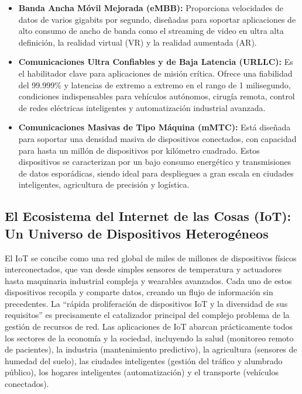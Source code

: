 \documentclass[12pt,a4paper]{article}
\begin{document}
\begin{itemize}
    \item \textbf{Banda Ancha Móvil Mejorada (eMBB):} Proporciona velocidades de datos de varios gigabits por segundo, diseñadas para soportar aplicaciones de alto consumo de ancho de banda como el streaming de video en ultra alta definición, la realidad virtual (VR) y la realidad aumentada (AR)\cite{ref7}.
    
    \item \textbf{Comunicaciones Ultra Confiables y de Baja Latencia (URLLC):} Es el habilitador clave para aplicaciones de misión crítica. Ofrece una fiabilidad del 99.999\% y latencias de extremo a extremo en el rango de 1 milisegundo, condiciones indispensables para vehículos autónomos, cirugía remota, control de redes eléctricas inteligentes y automatización industrial avanzada\cite{ref5}.
    
    \item \textbf{Comunicaciones Masivas de Tipo Máquina (mMTC):} Está diseñada para soportar una densidad masiva de dispositivos conectados, con capacidad para hasta un millón de dispositivos por kilómetro cuadrado. Estos dispositivos se caracterizan por un bajo consumo energético y transmisiones de datos esporádicas, siendo ideal para despliegues a gran escala en ciudades inteligentes, agricultura de precisión y logística\cite{ref7}.
\end{itemize}

\subsection{El Ecosistema del Internet de las Cosas (IoT): Un Universo de Dispositivos Heterogéneos}

El IoT se concibe como una red global de miles de millones de dispositivos físicos interconectados, que van desde simples sensores de temperatura y actuadores hasta maquinaria industrial compleja y wearables avanzados\cite{ref1}. Cada uno de estos dispositivos recopila y comparte datos, creando un flujo de información sin precedentes. La ``rápida proliferación de dispositivos IoT y la diversidad de sus requisitos'' es precisamente el catalizador principal del complejo problema de la gestión de recursos de red. Las aplicaciones de IoT abarcan prácticamente todos los sectores de la economía y la sociedad, incluyendo la salud (monitoreo remoto de pacientes), la industria (mantenimiento predictivo), la agricultura (sensores de humedad del suelo), las ciudades inteligentes (gestión del tráfico y alumbrado público), los hogares inteligentes (automatización) y el transporte (vehículos conectados).
\end{document}
